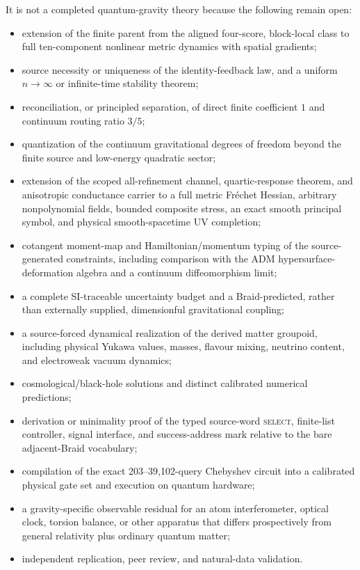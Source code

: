 \documentclass[11pt]{article}
\theoremstyle{definition}
\theoremstyle{remark}
\begin{document}
It is not a completed quantum-gravity theory because the following remain open:
\begin{itemize}
\item extension of the finite parent from the aligned four-score, block-local class to full ten-component nonlinear metric dynamics with spatial gradients;
\item source necessity or uniqueness of the identity-feedback law, and a uniform $n\to\infty$ or infinite-time stability theorem;
\item reconciliation, or principled separation, of direct finite coefficient $1$ and continuum routing ratio $3/5$;
\item quantization of the continuum gravitational degrees of freedom beyond the finite source and low-energy quadratic sector;
\item extension of the scoped all-refinement channel, quartic-response theorem, and anisotropic conductance carrier to a full metric Fr\'echet Hessian, arbitrary nonpolynomial fields, bounded composite stress, an exact smooth principal symbol, and physical smooth-spacetime UV completion;
\item cotangent moment-map and Hamiltonian/momentum typing of the source-generated constraints, including comparison with the ADM hypersurface-deformation algebra and a continuum diffeomorphism limit;
\item a complete SI-traceable uncertainty budget and a Braid-predicted, rather than externally supplied, dimensionful gravitational coupling;
\item a source-forced dynamical realization of the derived matter groupoid, including physical Yukawa values, masses, flavour mixing, neutrino content, and electroweak vacuum dynamics;
\item cosmological/black-hole solutions and distinct calibrated numerical predictions;
\item derivation or minimality proof of the typed source-word \textsc{select}, finite-list controller, signal interface, and success-address mark relative to the bare adjacent-Braid vocabulary;
\item compilation of the exact 203--39,102-query Chebyshev circuit into a calibrated physical gate set and execution on quantum hardware;
\item a gravity-specific observable residual for an atom interferometer, optical clock, torsion balance, or other apparatus that differs prospectively from general relativity plus ordinary quantum matter;
\item independent replication, peer review, and natural-data validation.
\end{itemize}
\end{document}
